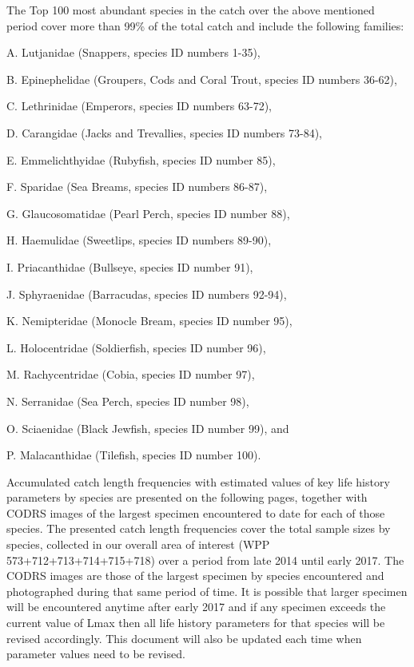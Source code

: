 The Top 100 most abundant species in the catch over the above mentioned period cover more than 99\% of the total catch and include the following families:

A. Lutjanidae (Snappers, species ID numbers 1-35),

B. Epinephelidae (Groupers, Cods and Coral Trout, species ID numbers 36-62),

C. Lethrinidae (Emperors, species ID numbers 63-72),

D. Carangidae (Jacks and Trevallies, species ID numbers 73-84),

E. Emmelichthyidae (Rubyfish, species ID number 85),

F. Sparidae (Sea Breams, species ID numbers 86-87),

G. Glaucosomatidae (Pearl Perch, species ID number 88),

H. Haemulidae (Sweetlips, species ID numbers 89-90),

I. Priacanthidae (Bullseye, species ID number 91),

J. Sphyraenidae (Barracudas, species ID numbers 92-94),

K. Nemipteridae (Monocle Bream, species ID number 95),

L. Holocentridae (Soldierfish, species ID number 96),

M. Rachycentridae (Cobia, species ID number 97),

N. Serranidae (Sea Perch, species ID number 98),

O. Sciaenidae (Black Jewfish, species ID number 99), and

P. Malacanthidae (Tilefish, species ID number 100).

Accumulated catch length frequencies with estimated values of key life history parameters by species are presented on the following pages, together with CODRS images of the largest specimen encountered to date for each of those species. The presented catch length frequencies cover the total sample sizes by species, collected in our overall area of interest (WPP 573+712+713+714+715+718) over a period from late 2014 until early 2017. The CODRS images are those of the largest specimen by species encountered and photographed during that same period of time. It is possible that larger specimen will be encountered anytime after early 2017 and if any specimen exceeds the current value of Lmax then all life history parameters for that species will be revised accordingly. This document will also be updated each time when parameter values need to be revised.


